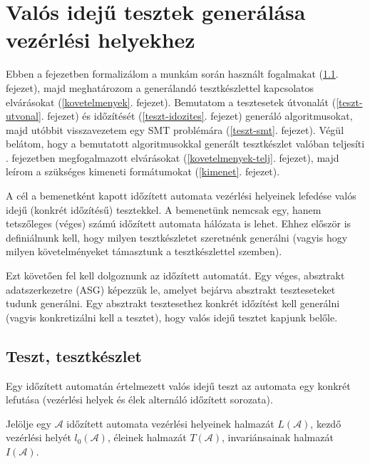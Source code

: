 
\chapter{Valós idejű tesztek generálása vezérlési helyekhez}\label{main-elmelet}

Ebben a fejezetben formalizálom a munkám során használt fogalmakat (\ref{teszt-tesztkeszlet}. fejezet), majd meghatározom a generálandó tesztkészlettel kapcsolatos elvárásokat (\ref{kovetelmenyek}. fejezet). Bemutatom a tesztesetek útvonalát (\ref{teszt-utvonal}. fejezet) és időzítését (\ref{teszt-idozites}. fejezet) generáló algoritmusokat, majd utóbbit visszavezetem egy SMT problémára (\ref{teszt-smt}. fejezet). Végül belátom, hogy a bemutatott algoritmusokkal generált tesztkészlet valóban teljesíti . fejezetben megfogalmazott elvárásokat (\ref{kovetelmenyek-telj}. fejezet), majd leírom a szükséges kimeneti formátumokat (\ref{kimenet}. fejezet).

A cél a bemenetként kapott időzített automata vezérlési helyeinek lefedése valós idejű (konkrét időzítésű) tesztekkel. A bemenetünk nemcsak egy, hanem tetszőleges (véges) számú időzített automata hálózata is lehet. Ehhez először is definiálnunk kell, hogy milyen tesztkészletet szeretnénk generálni (vagyis hogy milyen követelményeket támasztunk a tesztkészlettel szemben).

Ezt követően fel kell dolgoznunk az időzített automatát. Egy véges, absztrakt adatszerkezetre (ASG) képezzük le, amelyet bejárva absztrakt teszteseteket tudunk generálni. Egy absztrakt tesztesethez konkrét időzítést kell generálni (vagyis konkretizálni kell a tesztet), hogy valós idejű tesztet kapjunk belőle.

\section{Teszt, tesztkészlet} \label{teszt-tesztkeszlet}
Egy időzített automatán értelmezett valós idejű teszt az automata egy konkrét lefutása (vezérlési helyek és élek alternáló időzített sorozata).

Jelölje egy $\mathcal{A}$ időzített automata vezérlési helyeinek halmazát $L(\mathcal{A})$, kezdő vezérlési helyét $l_0(\mathcal{A})$, éleinek halmazát $T(\mathcal{A})$, invariánsainak halmazát $I(\mathcal{A})$.

